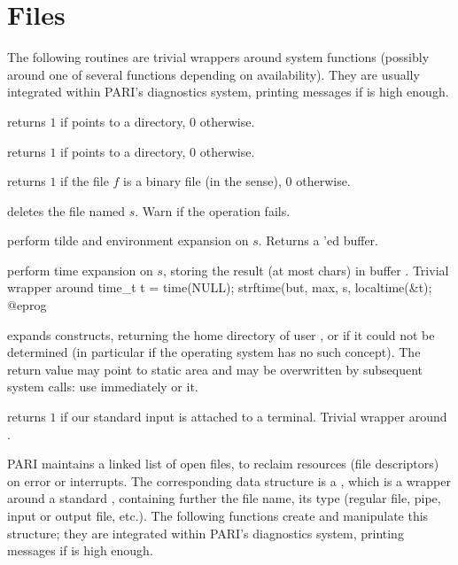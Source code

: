 

\section{Files}

The following routines are trivial wrappers around system functions
(possibly around one of several functions depending on availability).
They are usually integrated within PARI's diagnostics system, printing
messages if  is high enough.

 returns $1$ if  points to
a directory, $0$ otherwise.

 returns $1$ if  points to
a directory, $0$ otherwise.

 returns $1$ if the file $f$ is a binary
file (in the  sense), $0$ otherwise.

 deletes the file named $s$. Warn
if the operation fails.

 perform tilde and environment expansion
on $s$. Returns a 'ed buffer.

 perform
time expansion on $s$, storing the result (at most  chars) in
buffer . Trivial wrapper around
\bprog
  time_t t = time(NULL);
  strftime(but, max, s, localtime(&t);
@eprog

 expands 
constructs, returning the home directory of user , or  if
it could not be determined (in particular if the operating system has no such
concept). The return value may point to static area and may be overwritten
by subsequent system calls: use immediately or  it.

 returns $1$ if our standard input
 is attached to a terminal. Trivial wrapper around .


PARI maintains a linked list of open files, to reclaim resources
(file descriptors) on error or interrupts. The corresponding data structure
is a , which is a wrapper around a standard ,
containing further the file name, its type (regular file, pipe, input or
output file, etc.). The following functions create and manipulate this
structure; they are integrated within PARI's diagnostics system, printing
messages if  is high enough.

